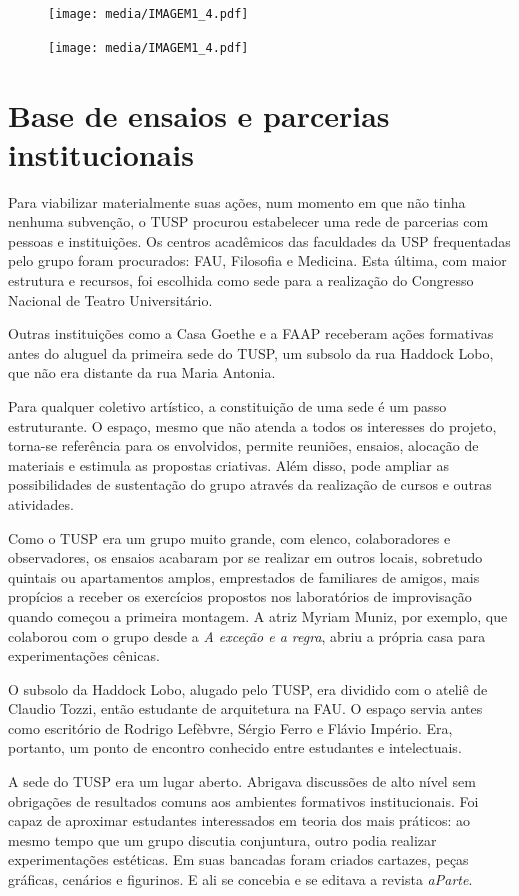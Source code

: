 \bigskip

\begin{figure}
\texttt{[image: media/IMAGEM1\_4.pdf]}

\texttt{[image: media/IMAGEM1\_4.pdf]}
\end{figure}

\section{Base de ensaios e parcerias institucionais}

Para viabilizar materialmente suas ações, num momento em que não tinha
nenhuma subvenção, o TUSP procurou estabelecer uma rede de parcerias com
pessoas e instituições. Os centros acadêmicos das faculdades da USP
frequentadas pelo grupo foram procurados: FAU, Filosofia e Medicina.
Esta última, com maior estrutura e recursos, foi escolhida como sede
para a realização do Congresso Nacional de Teatro Universitário.

Outras instituições como a Casa Goethe e a FAAP receberam ações
formativas antes do aluguel da primeira sede do TUSP, um subsolo da rua
Haddock Lobo, que não era distante da rua Maria Antonia.

Para qualquer coletivo artístico, a constituição de uma sede é um passo
estruturante. O espaço, mesmo que não atenda a todos os interesses do
projeto, torna-se referência para os envolvidos, permite reuniões,
ensaios, alocação de materiais e estimula as propostas criativas. Além
disso, pode ampliar as possibilidades de sustentação do grupo através da
realização de cursos e outras atividades.

Como o TUSP era um grupo muito grande, com elenco, colaboradores e
observadores, os ensaios acabaram por se realizar em outros locais,
sobretudo quintais ou apartamentos amplos, emprestados de familiares de
amigos, mais propícios a receber os exercícios propostos nos
laboratórios de improvisação quando começou a primeira montagem. A atriz
Myriam Muniz, por exemplo, que colaborou com o grupo desde a \textit{A
exceção e a regra}, abriu a própria casa para experimentações cênicas.

O subsolo da Haddock Lobo, alugado pelo TUSP, era dividido com o ateliê
de Claudio Tozzi, então estudante de arquitetura na FAU. O espaço servia
antes como escritório de Rodrigo Lefèbvre, Sérgio Ferro e Flávio
Império. Era, portanto, um ponto de encontro conhecido entre estudantes
e intelectuais.

A sede do TUSP era um lugar aberto. Abrigava discussões de alto nível
sem obrigações de resultados comuns aos ambientes formativos
institucionais. Foi capaz de aproximar estudantes interessados em teoria
dos mais práticos: ao mesmo tempo que um grupo discutia conjuntura,
outro podia realizar experimentações estéticas. Em suas bancadas foram
criados cartazes, peças gráficas, cenários e figurinos. E ali se
concebia e se editava a revista \textit{aParte}.

